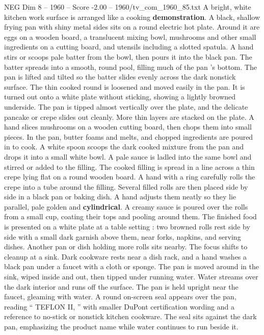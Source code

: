 \begin{textsample}{NEG Dim 8 – 1960 – Score -2.00 – 1960/tv\_com\_1960\_85.txt}  \label{ex:f8_neg_017}
A bright, white kitchen work surface is arranged like a cooking \textbf{demonstration}.
A black, shallow frying pan with shiny metal sides sits on a round electric hot plate.
Around it are eggs on a wooden board, a translucent mixing bowl, mushrooms and other small ingredients on a cutting board, and utensils including a slotted spatula.
A hand stirs or scoops pale batter from the bowl, then pours it into the black pan.
The batter spreads into a smooth, round pool, filling much of the pan ’s bottom.
The pan is lifted and tilted so the batter slides evenly across the dark nonstick surface.
The thin cooked round is loosened and moved easily in the pan.
It is turned out onto a white plate without sticking, showing a lightly browned underside.
The pan is tipped almost vertically over the plate, and the delicate pancake or crepe slides out cleanly.
More thin layers are stacked on the plate.
A hand slices mushrooms on a wooden cutting board, then chops them into small pieces.
In the pan, butter foams and melts, and chopped ingredients are poured in to cook.
A white spoon scoops the dark cooked mixture from the pan and drops it into a small white bowl.
A pale sauce is ladled into the same bowl and stirred or added to the filling.
The cooked filling is spread in a line across a thin crepe lying flat on a round wooden board.
A hand with a ring carefully rolls the crepe into a tube around the filling.
Several filled rolls are then placed side by side in a black pan or baking dish.
A hand adjusts them neatly so they lie parallel, pale golden and \textbf{cylindrical}.
A creamy sauce is poured over the rolls from a small cup, coating their tops and pooling around them.
The finished food is presented on a white plate at a table setting : two browned rolls rest side by side with a small dark garnish above them, near forks, napkins, and serving dishes.
Another pan or dish holding more rolls sits nearby.
The focus shifts to cleanup at a sink.
Dark cookware rests near a dish rack, and a hand washes a black pan under a faucet with a cloth or sponge.
The pan is moved around in the sink, wiped inside and out, then tipped under running water.
Water streams over the dark interior and runs off the surface.
The pan is held upright near the faucet, gleaming with water.
A round on-screen seal appears over the pan, reading “ TEFLON II, ” with smaller DuPont certification wording and a reference to no-stick or nonstick kitchen cookware.
The seal sits against the dark pan, emphasizing the product name while water continues to run beside it.

\end{textsample}
